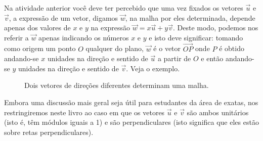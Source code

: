 \label{\detokenize{GE101-1:organizando-as-ideias-coordenadas-de-um-vetor}}
Na atividade anterior você deve ter percebido que uma vez fixados os vetores \(\vec{u}\) e \(\vec{v}\), a expressão de um vetor, digamos \(\vec{w}\), na malha por eles determinada,  depende apenas dos valores de \(x\) e \(y\) na expressão \(\vec{w} = x\vec{u} + y\vec{v}\).
Deste modo, podemos nos referir a \(\vec{w}\) apenas indicando os números \(x\) e \(y\) e isto deve significar: tomando como origem um ponto \(O\) qualquer do plano, \(\vec{w}\) é o vetor \(\overrightarrow{OP}\) onde \(P\) é obtido andando-se \(x\) unidades na direção e sentido de \(\vec{u}\) a partir de \(O\) e então andando-se \(y\) unidades na direção e sentido de \(\vec{v}\). Veja o exemplo.
\begin{figure}[H]\centering{}\caption{Dois vetores de direções diferentes determinam uma malha.}\end{figure}
Embora uma discussão mais geral seja útil para estudantes da área de exatas, nos restringiremos neste livro ao caso em que os vetores \(\vec{u}\) e \(\vec{v}\) são ambos unitários (isto é, têm módulos iguais a 1) e são perpendiculares (isto significa que eles estão sobre retas perpendiculares).

